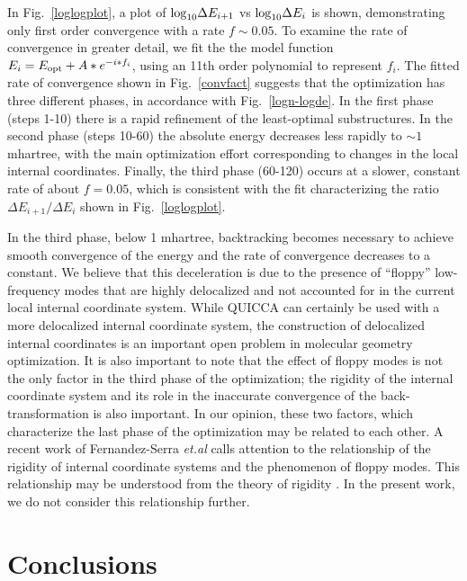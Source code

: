 \documentclass[prl,twocolumn,showpacs,twocolumngrid,superbib]{revtex4}
\begin{document}
In Fig.~\ref{loglogplot}, a plot of ${\rm log}_{10}{\Delta E_{i+1}}$ vs ${\rm log }_{10} {\Delta E_{i}}$ 
is shown, demonstrating only first order convergence with a rate $f \sim 0.05$.   To examine the rate of convergence
in greater detail, we fit the the model function $E_{i}=E_{\rm opt}+A*e^{-i * f_i}$, using  
an 11th order polynomial to represent $f_i$.  The fitted rate of convergence shown in Fig.~\ref{convfact}
suggests that the optimization has three different phases, in accordance with Fig.~\ref{logn-logde}.
In the first phase (steps 1-10) there is a rapid refinement of the least-optimal substructures. In the 
second phase (steps 10-60) the absolute energy decreases less rapidly to $\sim 1$ mhartree, with the  
main optimization effort corresponding to changes in the local internal coordinates. Finally, the third phase 
(60-120) occurs at a slower, constant rate of about $f=0.05$, which is consistent with the fit characterizing 
the ratio ${\Delta E_{i+1}}/{\Delta E_{i}}$ shown in Fig.~\ref{loglogplot}.

In the third phase, below 1 mhartree, backtracking becomes necessary to achieve smooth 
convergence of the energy and the rate of convergence decreases to a constant.  We believe
that this deceleration is due to the presence of ``floppy'' low-frequency modes
that are highly delocalized and not accounted for in the current local internal 
coordinate system.  While QUICCA can certainly be used with a more delocalized 
internal coordinate system, the construction of delocalized internal coordinates 
is an important open problem in molecular geometry optimization.   It is also important to note that 
the effect of floppy modes is not the only factor in the third phase of the optimization; the rigidity 
of the internal coordinate system and its role in the inaccurate convergence of the back-transformation 
is also important. In our opinion, these two factors, which characterize the last phase of the 
optimization may be related to each other.  A recent work of Fernandez-Serra {\it et.al} \cite{Serra03} 
calls attention to the relationship of the rigidity of internal coordinate systems and the 
phenomenon of floppy modes. This relationship may be understood from the theory of 
rigidity \cite{Phillips85}. In the present work, we do not 
consider this relationship further.

\section{Conclusions}
\end{document}
